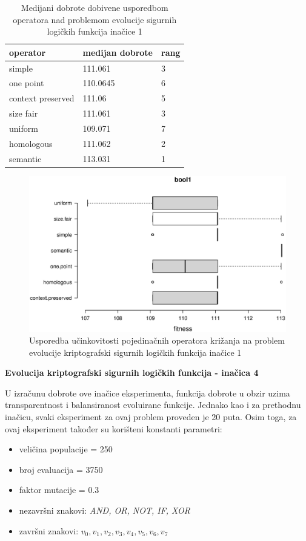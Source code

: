 \begin{table}[H]
 	\centering
\caption{Medijani dobrote dobivene usporedbom operatora nad problemom evolucije sigurnih logičkih funkcija inačice 1}
    \begin{tabular}{| l | l | l |}
    \hline
    \textbf{operator} & \textbf{medijan dobrote} & \textbf{rang}\\ \hline
    simple & 111.061 & 3\\ \hline
    one point & 110.0645 & 6\\ \hline
    context preserved & 111.06 & 5\\ \hline
    size fair & 111.061 & 3\\ \hline
    uniform & 109.071 & 7\\ \hline
    homologous & 111.062 & 2\\ \hline
    semantic & 113.031& 1\\ \hline
    \end{tabular}
    
    
    \label{bool1table}
\end{table}

\begin{figure}[H]
	\centering
	\includegraphics[trim=0cm 4cm 0cm 0cm, scale=0.5]{./slike/boxPlots/bool1.eps}
	\caption{Usporedba učinkovitosti pojedinačnih operatora križanja na problem evolucije kriptografski sigurnih logičkih funkcija inačice 1}
	\label{bool1box}
\end{figure}


\textbf{Evolucija kriptografski sigurnih logičkih funkcija - inačica 4}

U izračunu dobrote ove inačice eksperimenta, funkcija dobrote u obzir uzima transparentnost i balansiranost evoluirane funkcije. Jednako kao i za prethodnu inačicu, svaki eksperiment za ovaj problem proveden je 20 puta. Osim toga, za  ovaj eksperiment također su korišteni konstanti parametri:
\begin{itemize}
\item{veličina populacije = 250}
\item{broj evaluacija = 3750}
\item{faktor mutacije = 0.3}
\item{nezavršni znakovi: \textit{AND, OR, NOT, IF, XOR}}
\item{završni znakovi: \textit{$v_0, v_1, v_2, v_3, v_4, v_5, v_6, v_7$}}
\end{itemize}

